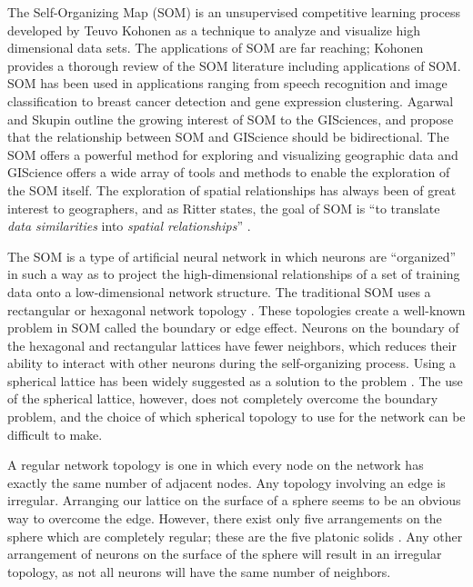 
The Self-Organizing Map (SOM) is an unsupervised competitive learning process
developed by Teuvo Kohonen as a technique to analyze and visualize high
dimensional data sets.  The applications of SOM are far reaching;
Kohonen \cite{Kohonen2000} provides a thorough review of the SOM literature including
applications of SOM.  SOM has been used in applications ranging from speech
recognition and image classification to breast cancer detection and gene
expression clustering.  Agarwal
and Skupin \cite{skupin07} outline the growing interest of SOM to
the GISciences, and propose that the relationship between SOM and GIScience
should be bidirectional.  The SOM offers a powerful method for exploring and
visualizing geographic data and GIScience offers a wide array of tools
and methods to enable the exploration of the SOM itself.  The exploration of
spatial relationships has always been of great interest to geographers, and as
Ritter
\cite{ritter99} states, the goal of SOM is ``to translate \emph{data
similarities} into \emph{spatial relationships}'' \cite[p. 1]{ritter99}. 

The SOM is a type of artificial neural network in which neurons are ``organized''
in such a way as to project the high-dimensional relationships of a set of
training data onto a low-dimensional network structure.  The traditional
SOM uses a rectangular or hexagonal network topology \cite{Kohonen2000}.  These topologies 
create a well-known problem in SOM called the boundary or edge effect.  Neurons on
the boundary of the hexagonal and rectangular lattices have fewer neighbors,
which reduces their ability to interact with other neurons during the
self-organizing process.  Using a spherical lattice has been widely suggested as a
solution to the problem \cite{ritter99, boudjemai2003, sangole03,
Nishio:2006fk, wu2006}. The use of the spherical lattice, however, does not
completely overcome the boundary problem, and the choice of which spherical
topology to use for the network can be difficult to make.

A regular network topology is one in which every node on the network has exactly the
same number of adjacent nodes.  Any topology involving an edge is irregular.
Arranging our lattice on the surface of a sphere seems to be an obvious
way to overcome the edge.  However, there exist only five arrangements on the
sphere which are completely regular; these are the five platonic solids \cite{ritter99,
harris2000}.  Any other arrangement of neurons on the surface of the sphere will
result in an irregular topology, as not all neurons will have the same number of
neighbors.

